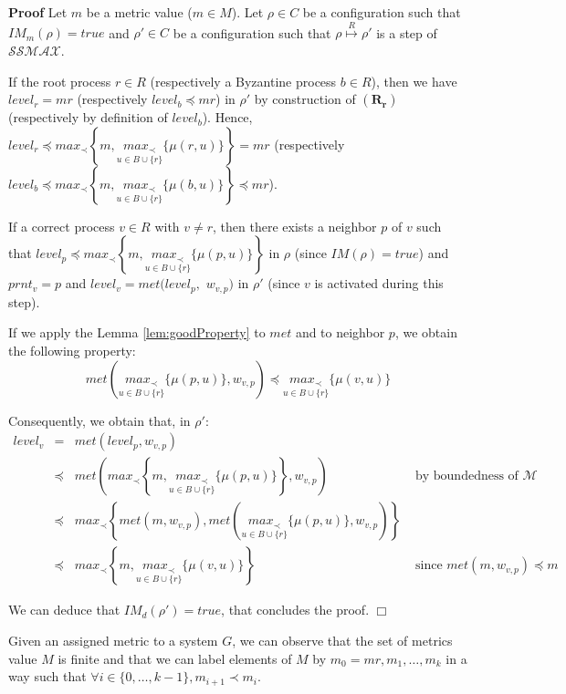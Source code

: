 \documentclass[11pt]{article}
\newenvironment{proof}{\noindent\textbf{Proof}}{\hfill\qed}
\newcommand{\qed}{\hfill$\Box$}
\begin{document}
\begin{proof}
Let $m$ be a metric value ($m\in M$). Let $\rho\in C$ be a configuration such that $IM_m(\rho)=true$ and $\rho'\in C$ be a configuration such that $\rho \stackrel{R}{\mapsto} \rho'$ is a step of $\mathcal{SSMAX}$.

If the root process $r\in R$ (respectively a Byzantine process $b\in R$), then we have $level_r=mr$ (respectively $level_b\preceq mr$) in $\rho'$ by construction of $\boldsymbol{(R_r)}$ (respectively by definition of $level_b$). Hence, $level_r\preceq max_\prec\left\{m, \underset{u\in B\cup\{r\}}{max_\prec}\{\mu(r,u)\}\right\}=mr$ (respectively $level_b\preceq max_\prec\left\{m,\underset{u\in B\cup\{r\}}{max_\prec}\{\mu(b,u)\}\right\}\preceq mr$).

If a correct process $v\in R$ with $v\neq r$, then there exists a neighbor $p$ of $v$ such that $level_p\preceq max_\prec\left\{m,\underset{u\in B\cup\{r\}}{max_\prec}\{\mu(p,u)\}\right\}$ in $\rho$ (since $IM(\rho)=true$) and $prnt_v=p$ and $level_v=met(level_p,$ $w_{v,p})$ in $\rho'$ (since $v$ is activated during this step).

If we apply the Lemma \ref{lem:goodProperty} to $met$ and to neighbor $p$, we obtain the following property:
\[met\left(\underset{u\in B\cup\{r\}}{max_\prec}\{\mu(p,u)\},w_{v,p}\right)\preceq\underset{u\in B\cup\{r\}}{max_\prec}\{\mu(v,u)\}\]  

Consequently, we obtain that, in $\rho'$:
\[\begin{array}{rcll}
level_v & = & met(level_p,w_{v,p})&\\
& \preceq & met\left(max_\prec\left\{m,\underset{u\in B\cup\{r\}}{max_\prec}\{\mu(p,u)\}\right\},w_{v,p}\right)&\text{ by boundedness of }\mathcal{M}\\
& \preceq & max_\prec\left\{met(m,w_{v,p}),met\left(\underset{u\in B\cup\{r\}}{max_\prec}\{\mu(p,u)\},w_{v,p}\right) \right\}&\\
& \preceq & max_\prec\left\{m,\underset{u\in B\cup\{r\}}{max_\prec}\{\mu(v,u)\}\right\}&\text{ since } met(m,w_{v,p})\preceq m
\end{array}\]

We can deduce that $IM_d(\rho')=true$, that concludes the proof.
\end{proof}

Given an assigned metric to a system $G$, we can observe that the set of metrics value $M$ is finite and that we can label elements of $M$ by $m_0=mr,m_1,\ldots,m_k$ in a way such that $\forall i\in\{0,\ldots,k-1\},m_{i+1}\prec m_i$.
\end{document}
